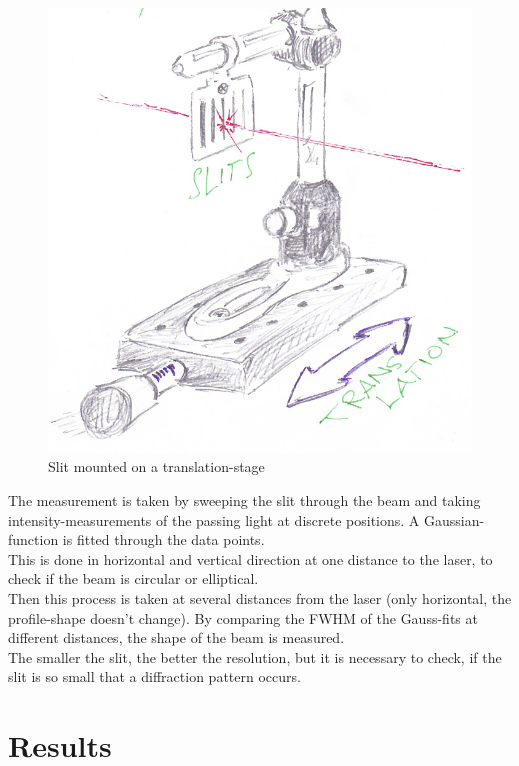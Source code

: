 \documentclass[12pt,a4paper]{article}
\begin{document}
\begin{multicols}{2}
\begin{figure}[H]
 \centering
 \includegraphics[scale=0.7]{./figures/shape_measure.png}
 \caption{Slit mounted on a translation-stage}
 \label{fig:shape_measure}
\end{figure}

The measurement is taken by sweeping the slit through the beam and taking intensity-measurements of the passing light at discrete positions. A Gaussian-function is fitted through the data points.\\
This is done in horizontal and vertical direction at one distance to the laser, to check if the beam is circular or elliptical.\\
Then this process is taken at several distances from the laser (only horizontal, the profile-shape doesn't change). By comparing the FWHM of the Gauss-fits at different distances, the shape of the beam is measured.\\
The smaller the slit, the better the resolution, but it is necessary to check, if the slit is so small that a diffraction pattern occurs.

\pagebreak
\section{Results}



\end{multicols}
\end{document}
